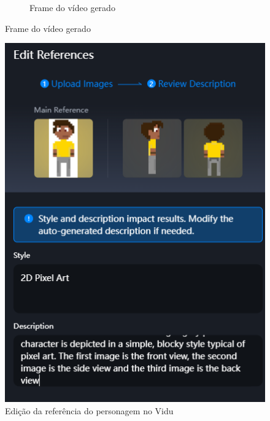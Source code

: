 \begin{figure}[htbp]
\begin{subfigure}{0.55\linewidth}
        \caption{\small Frame do vídeo gerado}
        \label{fig:vidu9b}
    \end{subfigure}
\end{figure}

\begin{figure}[htbp]
    \centering
    \caption{\small Edição da referência do personagem no Vidu}
    \label{fig:viduReferenciaPabloEditado}
    \includegraphics[width=0.4\linewidth]{figs/vidu/tela_referencia_2_editado2.PNG}
\end{figure}

